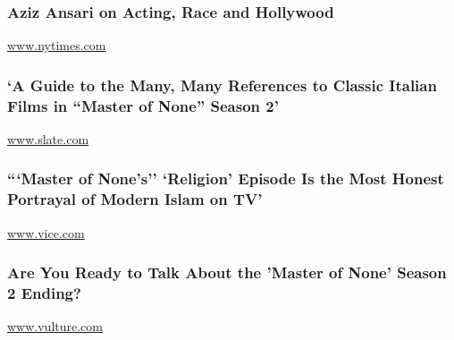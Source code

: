 \hypertarget{aziz-ansari-on-acting-race-and-hollywood}{%
\subsubsection{Aziz Ansari on Acting, Race and
Hollywood}\label{aziz-ansari-on-acting-race-and-hollywood}}

\href{http://www.nytimes.com}{www.nytimes.com}

\href{http://www.slate.com/blogs/browbeat/2017/05/12/master_of_none_s_references_to_italian_movies_a_guide.html}{}

\hypertarget{a-guide-to-the-many-many-references-to-classic-italian-films-in-master-of-none-season-2}{%
\subsubsection{`A Guide to the Many, Many References to Classic Italian
Films in ``Master of None'' Season
2'}\label{a-guide-to-the-many-many-references-to-classic-italian-films-in-master-of-none-season-2}}

\href{http://www.slate.com}{www.slate.com}

\href{https://www.vice.com/en_ca/article/master-of-nones-religion-episode-is-the-most-honest-portrayal-of-modern-islam-on-tv}{}

\hypertarget{master-of-nones-religion-episode-is-the-most-honest-portrayal-of-modern-islam-on-tv}{%
\subsubsection{```Master of None's'' `Religion' Episode Is the Most
Honest Portrayal of Modern Islam on
TV'}\label{master-of-nones-religion-episode-is-the-most-honest-portrayal-of-modern-islam-on-tv}}

\href{http://www.vice.com}{www.vice.com}

\href{http://www.vulture.com/2017/05/master-of-none-season-two-finale-ending-discussion.html}{}

\hypertarget{are-you-ready-to-talk-about-the-master-of-none-season-2-ending}{%
\subsubsection{Are You Ready to Talk About the 'Master of None' Season 2
Ending?}\label{are-you-ready-to-talk-about-the-master-of-none-season-2-ending}}

\href{http://www.vulture.com}{www.vulture.com}

